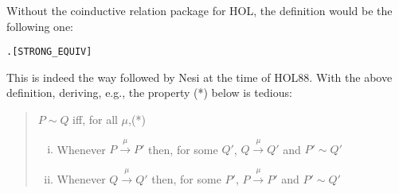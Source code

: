 Without the coinductive relation package for HOL,
the definition would be the following one:
\begin{alltt}
   \HOLSymConst{\HOLTokenStrongEQ}  \HOLSymConst{\HOLTokenDefEquality{}} \HOLSymConst{\HOLTokenExists{}}.    \HOLSymConst{\HOLTokenConj{}}  \hfill{[STRONG_EQUIV]}
\end{alltt}
This is indeed the way followed by Nesi \cite{Nesi:1992ve} at  the
  time of HOL88. With the above definition, deriving, e.g.,
 the  property (*) below \citep[p.~91]{Mil89}  is tedious:
\begin{quote}
  $P\sim Q$ iff, for all $\mu$,\hfill{(*)}
  \begin{enumerate}[(i)]
    \item Whenever $P\overset{\mu}{\rightarrow}P'$ then, for some
      $Q'$, $Q\overset{\mu}{\rightarrow}Q'$ and $P'\sim Q'$
    \item Whenever $Q\overset{\mu}{\rightarrow}Q'$ then, for some
      $P'$, $P\overset{\mu}{\rightarrow}P'$ and $P'\sim Q'$
  \end{enumerate}
\end{quote}

